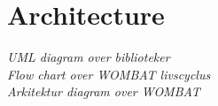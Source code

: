 \section{Architecture}
\textit{UML diagram over biblioteker\\
Flow chart over WOMBAT livscyclus\\
Arkitektur diagram over WOMBAT}